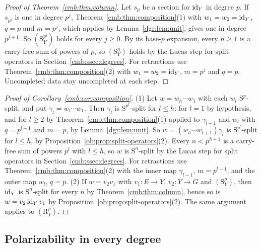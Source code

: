 \begin{proof}[Proof of Theorem~\ref{cmb:thm:column}]
Let $s_p$ be a section for $\mathrm{id}_Y$ in degree $p$. If $s_{p^j}$ is one in degree $p^j$, Theorem~\ref{cmb:thm:composition}(1)
with $w_1=w_2=\mathrm{id}_Y$, $q=p$ and $m=p^j$, which applies by Lemma~\ref{dgr:lem:unit}, gives one in degree $p^{j+1}$. So
$(\mathrm S^{p^j}_Y)$ holds for every $j\ge0$. By its base-$p$ expansion, every $n\ge1$ is a carry-free sum of powers of
$p$, so $(\mathrm S^n_Y)$ holds by the Lucas step for split operators in Section~\ref{cmb:ssec:degrees}. For retractions
use Theorem~\ref{cmb:thm:composition}(2) with $w_1=w_2=\mathrm{id}_Y$, $m=p^j$ and $q=p$. Uncompleted data stay uncompleted at each
step.
\end{proof}

\begin{proof}[Proof of Corollary~\ref{cmb:cor:composition}]
(1) Let $w=w_h\cdots w_1$ with each $w_l$ $\mathrm S^p$-split, and put $\gamma_l=w_l\cdots w_1$. Then $\gamma_l$ is
$\mathrm S^{p^l}$-split for $l\le h$: for $l=1$ by hypothesis, and for $l\ge2$ by Theorem~\ref{cmb:thm:composition}(1)
applied to $\gamma_{l-1}$ and $w_l$ with $q=p^{l-1}$ and $m=p$, by Lemma~\ref{dgr:lem:unit}. So $w=(w_h\cdots w_{l+1})\gamma_l$ is
$\mathrm S^{p^l}$-split for $l\le h$, by Proposition~\ref{ob:prop:split-operators}(2). Every $n<p^{h+1}$ is a carry-free
sum of powers $p^l$ with $l\le h$, so $w$ is $\mathrm S^n$-split by the Lucas step for split operators in
Section~\ref{cmb:ssec:degrees}. For retractions use Theorem~\ref{cmb:thm:composition}(2) with the inner map
$\gamma_{l-1}$, $m=p^{l-1}$, and the outer map $w_l$, $q=p$.
(2) If $w=v_2v_1$ with $v_1\colon E\to Y$, $v_2\colon Y\to G$ and $(\mathrm S^p_Y)$, then $\mathrm{id}_Y$ is $\mathrm S^n$-split for
every $n$ by Theorem~\ref{cmb:thm:column}, hence so is $w=v_2\,\mathrm{id}_Y\,v_1$ by Proposition~\ref{ob:prop:split-operators}(2).
The same argument applies to $(\mathrm R^p_Y)$.
\end{proof}

\subsection{Polarizability in every degree}\label{dgr:ssec:polarizable}

